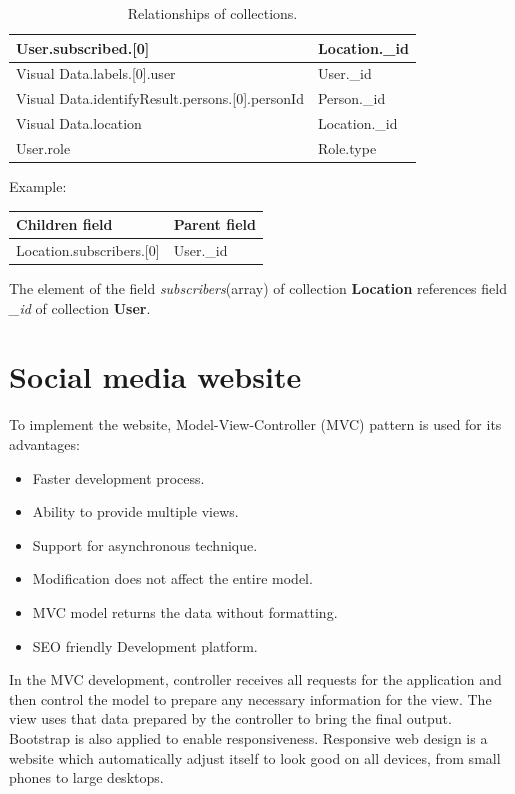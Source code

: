\begin{table}[H]
\begin{tabular}{|l|l|}
		User.subscribed.{[}0{]}                             & Location.\_id         \\ \hline
		Visual Data.labels.{[}0{]}.user                     & User.\_id             \\ \hline
		Visual Data.identifyResult.persons.{[}0{]}.personId & Person.\_id           \\ \hline
		Visual Data.location                                & Location.\_id         \\ \hline
		User.role                                           & Role.type             \\ \hline
	\end{tabular}
	\caption{Relationships of collections.}
\end{table}
\cleardoublepage
Example:
\begin{table}[H]
	\begin{tabular}{|l|l|}
		\hline
		Children field               & Parent field \\ \hline
		Location.subscribers.{[}0{]} & User.\_id    \\ \hline
	\end{tabular}
\end{table}
The element of the field \textit{subscribers}(array) of collection \textbf{Location} references field \textit{\_id} of collection \textbf{User}.
\section{Social media website}
To implement the website, Model-View-Controller (MVC) pattern is used for its advantages:
\begin{itemize}
\item Faster development process.
\item Ability to provide multiple views.
\item Support for asynchronous technique.
\item Modification does not affect the entire model.
\item MVC model returns the data without formatting.
\item SEO friendly Development platform.
\end{itemize}
In the MVC development, controller receives all requests for the application and then control the model to prepare any necessary information for the view. The view uses that data prepared by the controller to bring the final output.
Bootstrap is also applied to enable responsiveness. Responsive web design is a website which automatically adjust itself to look good on all devices, from small phones to large desktops.
